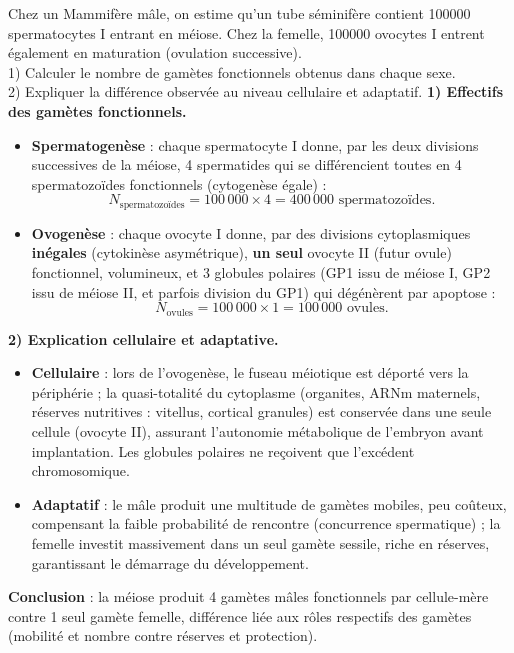 \documentclass[11pt]{article}
\begin{document}
\begin{exoresolu}
Chez un Mammifère mâle, on estime qu'un tube séminifère contient \num{100000} spermatocytes I entrant en méiose. Chez la femelle, \num{100000} ovocytes I entrent également en maturation (ovulation successive).\\
1) Calculer le nombre de gamètes fonctionnels obtenus dans chaque sexe.\\
2) Expliquer la différence observée au niveau cellulaire et adaptatif.
\tcblower
\textbf{1) Effectifs des gamètes fonctionnels.}
\begin{itemize}
\item \textbf{Spermatogenèse} : chaque spermatocyte I donne, par les deux divisions successives de la méiose, 4 spermatides qui se différencient toutes en 4 spermatozoïdes fonctionnels (cytogenèse égale) :
\[ N_{\text{spermatozoïdes}} = 100\,000 \times 4 = 400\,000 \text{ spermatozoïdes.} \]
\item \textbf{Ovogenèse} : chaque ovocyte I donne, par des divisions cytoplasmiques \textbf{inégales} (cytokinèse asymétrique), \textbf{un seul} ovocyte II (futur ovule) fonctionnel, volumineux, et 3 globules polaires (GP1 issu de méiose I, GP2 issu de méiose II, et parfois division du GP1) qui dégénèrent par apoptose :
\[ N_{\text{ovules}} = 100\,000 \times 1 = 100\,000 \text{ ovules.} \]
\end{itemize}
\textbf{2) Explication cellulaire et adaptative.}\\
\begin{itemize}
\item \textbf{Cellulaire} : lors de l'ovogenèse, le fuseau méiotique est déporté vers la périphérie ; la quasi-totalité du cytoplasme (organites, ARNm maternels, réserves nutritives : vitellus, cortical granules) est conservée dans une seule cellule (ovocyte II), assurant l'autonomie métabolique de l'embryon avant implantation. Les globules polaires ne reçoivent que l'excédent chromosomique.
\item \textbf{Adaptatif} : le mâle produit une multitude de gamètes mobiles, peu coûteux, compensant la faible probabilité de rencontre (concurrence spermatique) ; la femelle investit massivement dans un seul gamète sessile, riche en réserves, garantissant le démarrage du développement.
\end{itemize}
\textbf{Conclusion} : la méiose produit 4 gamètes mâles fonctionnels par cellule-mère contre 1 seul gamète femelle, différence liée aux rôles respectifs des gamètes (mobilité et nombre contre réserves et protection).
\end{exoresolu}
\end{document}
